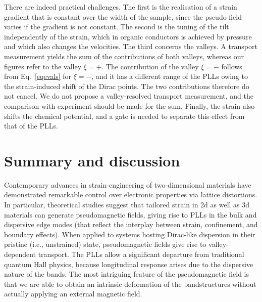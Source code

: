 \documentclass[aps,prb, onecolumn, nofootinbib, citeautoscript,10pt]{revtex4-2}
\begin{document}
There are indeed practical challenges. The first is the realisation of a strain gradient that is constant over the width of the sample, since the pseudo-field varies if the gradient is not constant. The second is the tuning of the tilt independently of the strain, which in organic conductors is achieved by pressure and which also changes the velocities. The third concerns the valleys. A transport measurement yields the sum of the contributions of both valleys, whereas our figures refer to the valley $\xi=+$. The contribution of the valley $\xi=-$ follows from Eq.~\eqref{eqevals} for $\xi=-$, and it has a different range of the PLLs owing to the strain-induced shift of the Dirac points. The two contributions therefore do not cancel. We do not propose a valley-resolved transport measurement, and the comparison with experiment should be made for the sum. Finally, the strain also shifts the chemical potential, and a gate is needed to separate this effect from that of the PLLs.

\section{Summary and discussion}
\label{secsum}


Contemporary advances in strain-engineering of two-dimensional materials have demonstrated remarkable control over electronic properties via lattice distortions. In particular, theoretical studies suggest that tailored strain in 2d as well as 3d materials can generate pseudomagnetic fields, giving rise to PLLs in the bulk and dispersive edge modes (that reflect the interplay between strain, confinement, and boundary effects). When applied to systems hosting Dirac-like dispersion in their pristine (i.e., unstrained) state, pseudomagnetic fields give rise to valley-dependent transport. The PLLs allow a significant departure from traditional quantum Hall physics, because longitudinal response arises due to the dispersive nature of the bands. The most intriguing feature of the pseudomagnetic field is that we are able to obtain an intrinsic deformation of the bandstructures without actually applying an external magnetic field.
\end{document}
